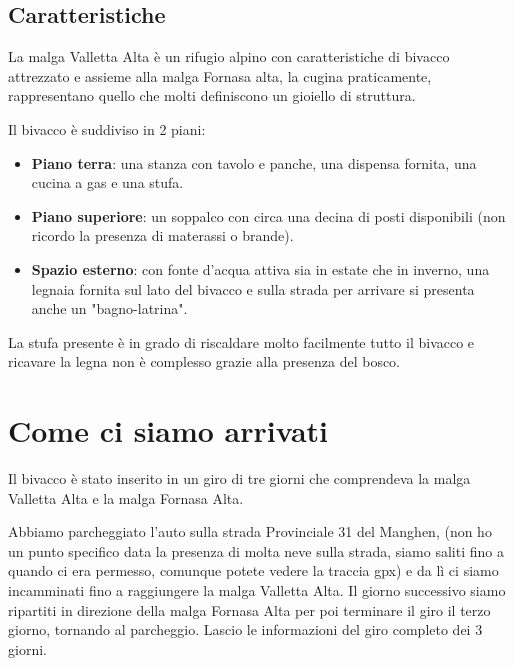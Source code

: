 \documentclass{article}
\begin{document}
\subsection{Caratteristiche}
La malga Valletta Alta è un rifugio alpino con caratteristiche di bivacco attrezzato e assieme alla malga Fornasa alta, la cugina praticamente, rappresentano quello che molti definiscono un gioiello di struttura.

Il bivacco è suddiviso in 2 piani:
\begin{itemize}
    \item \textbf{Piano terra}: una stanza con tavolo e panche, una dispensa fornita, una cucina a gas e una stufa.
    \item \textbf{Piano superiore}: un soppalco con circa una decina di posti disponibili (non ricordo la presenza di materassi o brande).
    \item \textbf{Spazio esterno}: con fonte d'acqua attiva sia in estate che in inverno, una legnaia fornita sul lato del bivacco e sulla strada per arrivare si presenta anche un "bagno-latrina".
\end{itemize}

La stufa presente è in grado di riscaldare molto facilmente tutto il bivacco e ricavare la legna non è complesso grazie alla presenza del bosco.

\section{Come ci siamo arrivati}
Il bivacco è stato inserito in un giro di tre giorni che comprendeva la malga Valletta Alta e la malga Fornasa Alta.

Abbiamo parcheggiato l’auto sulla strada Provinciale 31 del Manghen, (non ho un punto specifico data la presenza di molta neve sulla strada, siamo saliti fino a quando ci era permesso, comunque potete vedere la traccia gpx) e da lì ci siamo incamminati fino a raggiungere la malga Valletta Alta. Il giorno successivo siamo ripartiti in direzione della malga Fornasa Alta per poi terminare il giro il terzo giorno, tornando al parcheggio.
Lascio le informazioni del giro completo dei 3 giorni.
\end{document}
